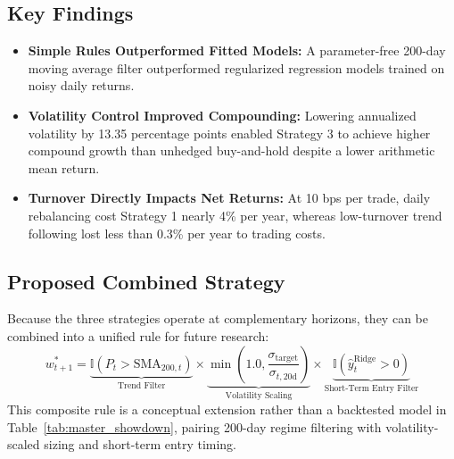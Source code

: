 \documentclass[11pt, a4paper]{article}
\begin{document}
\subsection{Key Findings}
\begin{itemize}
    \item \textbf{Simple Rules Outperformed Fitted Models:} A parameter-free 200-day moving average filter outperformed regularized regression models trained on noisy daily returns.
    \item \textbf{Volatility Control Improved Compounding:} Lowering annualized volatility by 13.35 percentage points enabled Strategy 3 to achieve higher compound growth than unhedged buy-and-hold despite a lower arithmetic mean return.
    \item \textbf{Turnover Directly Impacts Net Returns:} At 10 bps per trade, daily rebalancing cost Strategy 1 nearly 4\% per year, whereas low-turnover trend following lost less than 0.3\% per year to trading costs.
\end{itemize}

\subsection{Proposed Combined Strategy}
Because the three strategies operate at complementary horizons, they can be combined into a unified rule for future research:
\begin{equation}
w_{t+1}^* = \underbrace{\mathbb{I}(P_t > \text{SMA}_{200,t})}_{\text{Trend Filter}} \times \underbrace{\min\left(1.0, \frac{\sigma_{\text{target}}}{\sigma_{t, 20\text{d}}}\right)}_{\text{Volatility Scaling}} \times \underbrace{\mathbb{I}(\hat{y}_t^{\text{Ridge}} > 0)}_{\text{Short-Term Entry Filter}}
\end{equation}
This composite rule is a conceptual extension rather than a backtested model in Table~\ref{tab:master_showdown}, pairing 200-day regime filtering with volatility-scaled sizing and short-term entry timing.
\end{document}
